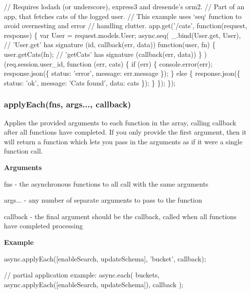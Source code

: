 \begin{DoxyCode}
\textcolor{comment}{// Requires lodash (or underscore), express3 and dresende's orm2.}
\textcolor{comment}{// Part of an app, that fetches cats of the logged user.}
\textcolor{comment}{// This example uses `seq` function to avoid overnesting and error }
\textcolor{comment}{// handling clutter.}
app.get(\textcolor{stringliteral}{'/cats'}, \textcolor{keyword}{function}(request, response) \{
  var User = request.models.User;
  async.seq(
    \_.bind(User.get, User),  \textcolor{comment}{// 'User.get' has signature (id, callback(err, data))}
    \textcolor{keyword}{function}(user, fn) \{
      user.getCats(fn);      \textcolor{comment}{// 'getCats' has signature (callback(err, data))}
    \}
  )(req.session.user\_id, function (err, cats) \{
    \textcolor{keywordflow}{if} (err) \{
      console.error(err);
      response.json(\{ status: \textcolor{stringliteral}{'error'}, message: err.message \});
    \} \textcolor{keywordflow}{else} \{
      response.json(\{ status: \textcolor{stringliteral}{'ok'}, message: \textcolor{stringliteral}{'Cats found'}, data: cats \});
    \}
  \});
\});
\end{DoxyCode}
 

 \label{_applyEach}%
 \subsubsection*{apply\+Each(fns, args..., callback)}

Applies the provided arguments to each function in the array, calling {\ttfamily callback} after all functions have completed. If you only provide the first argument, then it will return a function which lets you pass in the arguments as if it were a single function call.

{\bfseries Arguments}


\begin{DoxyItemize}
\item {\ttfamily fns} -\/ the asynchronous functions to all call with the same arguments
\item {\ttfamily args...} -\/ any number of separate arguments to pass to the function
\item {\ttfamily callback} -\/ the final argument should be the callback, called when all functions have completed processing
\end{DoxyItemize}

{\bfseries Example}


\begin{DoxyCode}
async.applyEach([enableSearch, updateSchema], \textcolor{stringliteral}{'bucket'}, callback);

\textcolor{comment}{// partial application example:}
async.each(
    buckets,
    async.applyEach([enableSearch, updateSchema]),
    callback
);
\end{DoxyCode}
 



